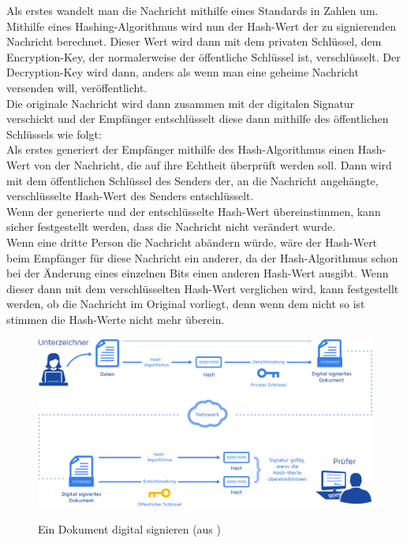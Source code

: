 \documentclass[12pt,a4paper]{scrartcl}
\begin{document}
Als erstes wandelt man die Nachricht mithilfe eines Standards in Zahlen um. Mithilfe eines Hashing-Algorithmus wird nun der Hash-Wert der zu signierenden Nachricht berechnet. Dieser Wert wird dann mit dem privaten Schlüssel, dem Encryption-Key, der normalerweise der öffentliche Schlüssel ist, verschlüsselt. %
	Der Decryption-Key wird dann, anders als wenn man eine geheime Nachricht versenden will, veröffentlicht.\\
	Die originale Nachricht wird dann zusammen mit der digitalen Signatur verschickt und der Empfänger entschlüsselt diese dann mithilfe des öffentlichen Schlüssels wie folgt:\\
	Als erstes generiert der Empfänger mithilfe des Hash-Algorithmus einen Hash-Wert von der Nachricht, die auf ihre Echtheit überprüft werden soll. Dann wird mit dem öffentlichen Schlüssel des Senders der, an die Nachricht angehängte, verschlüsselte Hash-Wert des Senders entschlüsselt. \\
Wenn der generierte und der entschlüsselte Hash-Wert übereinstimmen, kann sicher festgestellt werden, dass die Nachricht nicht verändert wurde. \\
Wenn eine dritte Person die Nachricht abändern würde, wäre der Hash-Wert beim Empfänger für diese Nachricht ein anderer, da der Hash-Algorithmus schon bei der Änderung eines einzelnen Bits einen anderen Hash-Wert ausgibt. Wenn dieser dann mit dem verschlüsselten Hash-Wert verglichen wird, kann festgestellt werden, ob die Nachricht im Original vorliegt, denn wenn dem nicht so ist stimmen die Hash-Werte nicht mehr überein.\\



\begin{figure}
\includegraphics[scale=0.45]{Dokument_digitale_Signatur} \\
\caption{Ein Dokument digital signieren (aus \cite{digitalsignature})}
\label{fig:figure3}
\end{figure}
\end{document}
